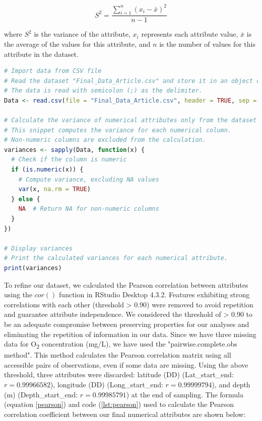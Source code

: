 \begin{equation}\label{variance}
    S^2 = \frac{\sum_{i=1}^{n} (x_i - \bar{x})^2}{n-1}
\end{equation}

where $S^2$ is the variance of the attribute, $x_i$ represents each attribute value, $\bar{x}$ is the average of the values for this attribute, and $n$ is the number of values for this attribute in the dataset.

\begin{lstlisting}[label=lst:variance,language=R,caption=RStudio script to calculate the variance of each numerical attributes in our final dataset]
# Import data from CSV file
# Read the dataset "Final_Data_Article.csv" and store it in an object called Data.
# The data is read with semicolon (;) as the delimiter.
Data <- read.csv(file = "Final_Data_Article.csv", header = TRUE, sep = ";")

# Calculate the variance of numerical attributes only from the dataset
# This snippet computes the variance for each numerical column.
# Non-numeric columns are excluded from the calculation.
variances <- sapply(Data, function(x) {
  # Check if the column is numeric
  if (is.numeric(x)) {
    # Compute variance, excluding NA values
    var(x, na.rm = TRUE)
  } else {
    NA  # Return NA for non-numeric columns
  }
})

# Display variances
# Print the calculated variances for each numerical attribute.
print(variances)
\end{lstlisting}

To refine our dataset, we calculated the Pearson correlation between attributes using the $cor()$ function in RStudio Desktop 4.3.2. Features exhibiting strong correlations with each other (threshold > 0.90) were removed to avoid repetition and guarantee attribute independence. We considered the threshold of > 0.90 to be an adequate compromise between preserving properties for our analyses and eliminating the repetition of information in our data. Since we have three missing data for O\textsubscript{2} concentration (mg/L), we have used the "pairwise.complete.obs method". This method calculates the Pearson correlation matrix using all accessible pairs of observations, even if some data are missing. Using the above threshold, three attributes were discarded: latitude (DD) (Lat_start_end: $r = 0.99966582$), longitude (DD) (Long_start_end: $r = 0.99999794$), and depth (m) (Depth_start_end: $r = 0.99985791$) at the end of sampling. The formula (equation \ref{pearson}) and code (\autoref{lst:pearson}) used to calculate the Pearson correlation coefficient between our final numerical attributes are shown below:


